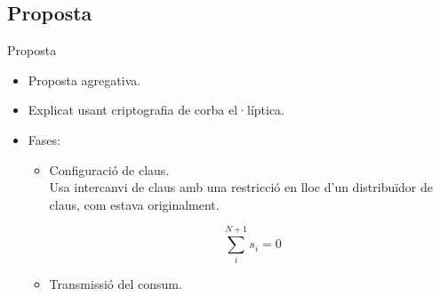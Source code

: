 \documentclass{beamer}
\begin{document}
\subsection{Proposta \cite{recsi}}
\begin{frame}{Proposta \cite{recsi}}
	\begin{itemize}
		\item Proposta agregativa.
		\item Explicat usant criptografia de corba el·líptica.
		\item Fases:
		\begin{itemize}
			\item Configuració de claus.
			\\Usa intercanvi de claus \alert{amb una restricció} en lloc d'un distribuïdor de claus, com estava originalment.
			\begin{multicols}{2}
			\[ \sum_{i}^{N+1} s_i = 0\]
			\only<2>{
			\[s_{sst} = - \sum_i^{N} s_{m_i}\]
			}
	\end{multicols}
			\item Transmissió del consum.
		\end{itemize}
	\end{itemize}
\end{frame}
\end{document}
